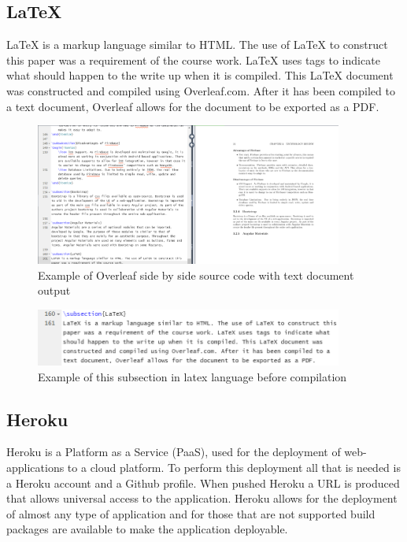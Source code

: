 \subsection{LaTeX}
LaTeX is a markup language similar to HTML. The use of LaTeX to construct this paper was a requirement of the course work. LaTeX uses tags to indicate what should happen to the write up when it is compiled. This LaTeX document was constructed and compiled using Overleaf.com. After it has been compiled to a text document, Overleaf allows for the document to be exported as a PDF. 

\begin{figure}[h!]
    	\caption{Example of Overleaf side by side source code with text document output}
	\centering
	\includegraphics[width=0.9\textwidth]{images/overleaf.png}
\end{figure}

\begin{figure}[h!]
    	\caption{Example of this subsection in latex language before compilation}
	\centering
	\includegraphics[width=0.9\textwidth]{images/latex.png}
\end{figure}

\subsection{Heroku}
Heroku is a Platform as a Service (PaaS), used for the deployment of web-applications to a cloud platform. To perform this deployment all that is needed is a Heroku account and a Github profile. When pushed Heroku a URL is produced that allows universal access to the application. Heroku allows for the deployment of almost any type of application and for those that are not supported build packages are available to make the application deployable. 









